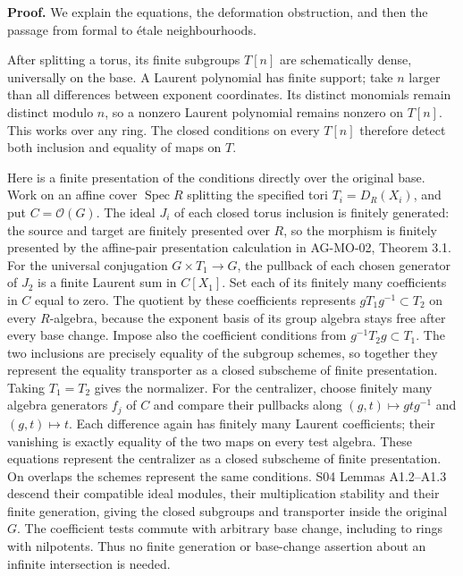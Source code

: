 \documentclass[11pt,a4paper,openany]{report}
\begin{document}
\textbf{Proof.} We explain the equations, the deformation obstruction, and then the passage from formal to étale neighbourhoods.

After splitting a torus, its finite subgroups \(T[n]\) are schematically dense, universally on the base. A Laurent polynomial has finite support; take \(n\) larger than all differences between exponent coordinates. Its distinct monomials remain distinct modulo \(n\), so a nonzero Laurent polynomial remains nonzero on \(T[n]\). This works over any ring. The closed conditions on every \(T[n]\) therefore detect both inclusion and equality of maps on \(T\).

Here is a finite presentation of the conditions directly over the original base. Work on an affine cover \(\operatorname{Spec}R\) splitting the specified tori \(T_i=D_R(X_i)\), and put \(C=\mathcal O(G)\). The ideal \(J_i\) of each closed torus inclusion is finitely generated: the source and target are finitely presented over \(R\), so the morphism is finitely presented by the affine-pair presentation calculation in AG-MO-02, Theorem 3.1. For the universal conjugation \(G\times T_1\to G\), the pullback of each chosen generator of \(J_2\) is a finite Laurent sum in \(C[X_1]\). Set each of its finitely many coefficients in \(C\) equal to zero. The quotient by these coefficients represents \(gT_1g^{-1}\subset T_2\) on every \(R\)-algebra, because the exponent basis of its group algebra stays free after every base change. Impose also the coefficient conditions from \(g^{-1}T_2g\subset T_1\). The two inclusions are precisely equality of the subgroup schemes, so together they represent the equality transporter as a closed subscheme of finite presentation. Taking \(T_1=T_2\) gives the normalizer. For the centralizer, choose finitely many algebra generators \(f_j\) of \(C\) and compare their pullbacks along \((g,t)\mapsto gtg^{-1}\) and \((g,t)\mapsto t\). Each difference again has finitely many Laurent coefficients; their vanishing is exactly equality of the two maps on every test algebra. These equations represent the centralizer as a closed subscheme of finite presentation. On overlaps the schemes represent the same conditions. S04 Lemmas A1.2--A1.3 descend their compatible ideal modules, their multiplication stability and their finite generation, giving the closed subgroups and transporter inside the original \(G\). The coefficient tests commute with arbitrary base change, including to rings with nilpotents. Thus no finite generation or base-change assertion about an infinite intersection is needed.
\end{document}
